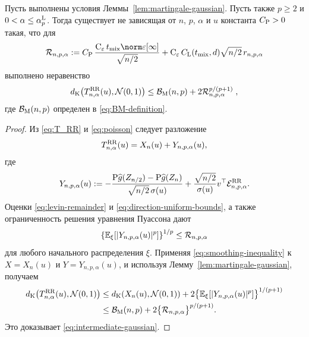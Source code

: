 \begin{lemma}
\label{lem:rr-remainder}
Пусть выполнены условия Леммы~\ref{lem:martingale-gaussian}. Пусть также
$p\geq2$ и $0<\alpha\leq\alpha_p^{\rm L}$. Тогда существует не зависящая
от $n$, $p$, $\alpha$ и $u$ константа $C_{\rm P}>0$ такая, что для
\begin{equation}\label{eq:RR-normalized-remainder}
 \mathcal R_{n,p,\alpha}
 :=C_{\rm P}\,
 \frac{\Const{\varepsilon}\taumix\supconsteps}
 {\sqrt{n/2}}
 +\Const{\varepsilon}C_{\rm L}(\taumix,d)
  \sqrt{n/2}\,r_{n,p,\alpha}
\end{equation}
выполнено неравенство
\begin{equation}\label{eq:intermediate-gaussian}
 d_{\mathrm K}\!\left(T_{n,\alpha}^{\mathrm{RR}}(u),\mathcal{N}(0,1)\right)
 \leq \mathcal B_{\rm M}(n,p)
 +2\mathcal R_{n,p,\alpha}^{p/(p+1)} \;,
\end{equation}
где $\mathcal B_{\rm M}(n, p)$ определен в \eqref{eq:BM-definition}.
\end{lemma}

\begin{proof}
Из \eqref{eq:T_RR} и \eqref{eq:poisson} следует разложение
\begin{equation}\label{eq:normalized-split}
 T_{n,\alpha}^{\mathrm{RR}}(u)
 =X_n(u)+Y_{n,p,\alpha}(u),
\end{equation}
где
\begin{align}\label{eq:normalized-error-part}
 Y_{n,p,\alpha}(u)
 :=-\frac{\mathrm{P}\widehat g(Z_{n/2})-\mathrm{P}\widehat g(Z_n)}
 {\sqrt{n/2}\,\sigma(u)}\notag +\frac{\sqrt{n/2}}{\sigma(u)}
 v^\top\mathcal{E}_{n,p,\alpha}^{\mathrm{RR}}.
\end{align}
Оценки \eqref{eq:levin-remainder} и \eqref{eq:direction-uniform-bounds},
а также ограниченность решения уравнения Пуассона дают
\[
 \left\{\mathbb{E}_\xi[\vert Y_{n,p,\alpha}(u)\vert^p]\right\}^{1/p}
 \leq\mathcal R_{n,p,\alpha}
\]
для любого начального распределения $\xi$. Применяя
\eqref{eq:smoothing-inequality} к $X=X_n(u)$ и
$Y=Y_{n,p,\alpha}(u)$, и используя Лемму~\ref{lem:martingale-gaussian}, получаем
\begin{align*}
 d_{\mathrm K}\!\left(T_{n,\alpha}^{\mathrm{RR}}(u),\mathcal{N}(0,1)\right)
 &\leq d_{\mathrm K}\!\left(X_n(u),\mathcal{N}(0,1)\right)
   +2\bigl\{\mathbb{E}_\xi[\vert Y_{n,p,\alpha}(u)\vert^p]\bigr\}^{1/(p+1)}\\
 &\leq\mathcal B_{\rm M}(n,p)
   +2\bigl\{\mathcal R_{n,p,\alpha}\bigr\}^{p/(p+1)}.
\end{align*}
Это доказывает \eqref{eq:intermediate-gaussian}.
\end{proof}

